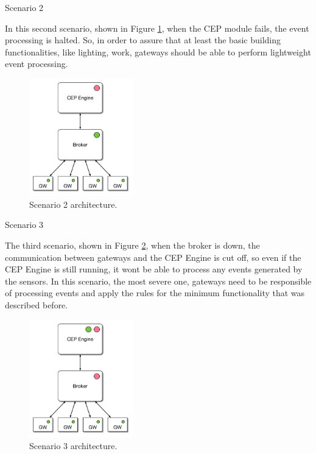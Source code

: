 \begin{Paragraph}{Scenario 2}
	
	In this second scenario, shown in Figure \ref{fig:sc2}, when the CEP module fails, the event processing is halted. So, in order to assure that at least the basic building functionalities, like lighting, work, gateways should be able to perform lightweight event processing.
	
	\begin{figure}[H]
		\centering
		\includegraphics[width=0.4\textwidth]{figures/sc2.png}
		\caption{Scenario 2 architecture. }
		\label{fig:sc2}
	\end{figure}
	
\end{Paragraph}

\begin{Paragraph}{Scenario 3}
	
	The third scenario, shown in Figure \ref{fig:sc3}, when the broker is down, the communication between gateways and the CEP Engine is cut off, so even if the CEP Engine is still running, it wont be able to process any events generated by the sensors.
	In this scenario, the most severe one, gateways need to be responsible of processing events and apply the rules for the minimum functionality that was described before.
	
	\begin{figure}[H]
		\centering
		\includegraphics[width=0.4\textwidth]{figures/sc3.png}
		\caption{Scenario 3 architecture. }
		\label{fig:sc3}
	\end{figure}
	
	
\end{Paragraph}

